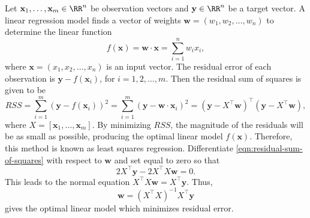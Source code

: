 \def\vb#1{\mathbf{#1}}
\cite{shawe2004kernel}
Let \(\vb{x}_1, \dots, \vb{x}_m \in \RR^n\) be observation vectors and \(\vb{y} \in \RR^n\) be a target vector.
A linear regression model finds a vector of weights \(\vb{w} = (w_1, w_2, \dots, w_n)\) to determine the linear function
\begin{equation}
    f(\vb{x}) = \vb{w} \cdot \vb{x} = \sum_{i=1}^{n} w_i x_i,
\end{equation}
where \(\vb{x} = (x_1, x_2, \dots, x_n)\) is an input vector.
The residual error of each observation is \(\vb{y} - f(\vb{x}_i)\), for \(i = 1,2, \dots, m\).
Then the residual sum of squares is given to be
\begin{equation}
    \label{eqn:residual-sum-of-squares}
    RSS
    = \sum_{i=1}^{m} (\vb{y} - f(\vb{x}_i))^2
    = \sum_{i=1}^{m} (\vb{y} - \vb{w} \cdot \vb{x}_i)^2
    = (\vb{y} - X^\top \vb{w})^\top (\vb{y} - X^\top \vb{w}),
\end{equation}
where \(X = [\vb{x}_1, \dots, \vb{x}_m]\).
By minimizing \(RSS\), the magnitude of the residuals will be as small as possible, producing the optimal linear model \(f(\vb{x})\).
Therefore, this method is known as least squares regression.
Differentiate \eqref{eqn:residual-sum-of-squares} with respect to \(\vb{w}\) and set equal to zero so that
\begin{equation}
    2 X^\top \vb{y} - 2 X^\top X \vb{w} = 0.
\end{equation}
This leads to the normal equation \(X^\top X \vb{w} = X^\top \vb{y}\).
Thus,
\begin{equation}
    \vb{w} = (X^\top X)^{-1} X^\top \vb{y}
\end{equation}
gives the optimal linear model which minimizes residual error.